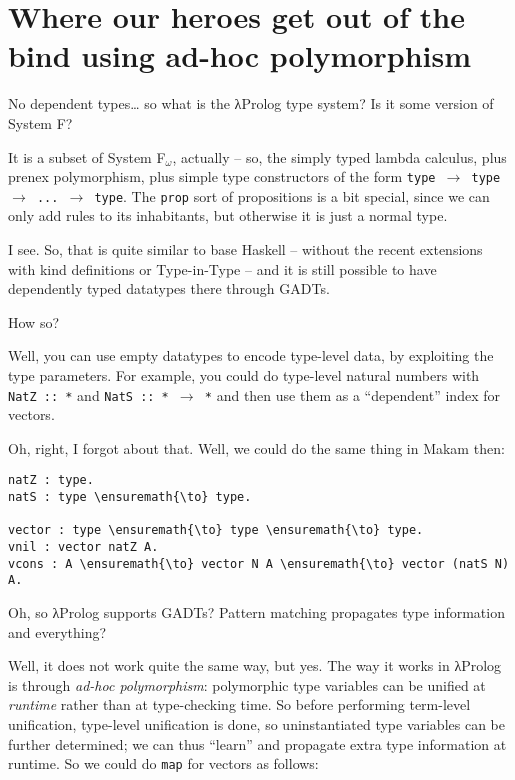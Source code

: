 \section{Where our heroes get out of the bind using ad-hoc
polymorphism}\label{where-our-heroes-get-out-of-the-bind-using-ad-hoc-polymorphism}

\heroSTUDENT{} No dependent types\ldots{} so what is the \foreignlanguage{greek}{λ}Prolog type system?
Is it some version of System F?

\heroADVISOR{} It is a subset of System F\(_\omega\), actually -- so, the
simply typed lambda calculus, plus prenex polymorphism, plus simple type
constructors of the form
\texttt{type\ \ensuremath{\to}\ type\ \ensuremath{\to}\ ...\ \ensuremath{\to}\ type}.
The \texttt{prop} sort of propositions is a bit special, since we can
only add rules to its inhabitants, but otherwise it is just a normal
type.

\heroSTUDENT{} I see. So, that is quite similar to base Haskell -- without the
recent extensions with kind definitions \citep{yorgey2012giving} or
Type-in-Type \citep{weirich2013system} -- and it is still possible to
have dependently typed datatypes there through GADTs.

\heroADVISOR{} How so?

\heroSTUDENT{} Well, you can use empty datatypes to encode type-level data, by
exploiting the type parameters. For example, you could do type-level
natural numbers with \texttt{NatZ\ ::\ *} and
\texttt{NatS\ ::\ *\ \ensuremath{\to}\ *} and then use them as a
``dependent'' index for vectors.

\heroADVISOR{} Oh, right, I forgot about that. Well, we could do the same
thing in Makam then:

\begin{verbatim}
natZ : type.
natS : type \ensuremath{\to} type.

vector : type \ensuremath{\to} type \ensuremath{\to} type.
vnil : vector natZ A.
vcons : A \ensuremath{\to} vector N A \ensuremath{\to} vector (natS N) A.
\end{verbatim}

\heroSTUDENT{} Oh, so \foreignlanguage{greek}{λ}Prolog supports GADTs? Pattern matching propagates type
information and everything?

\heroADVISOR{} Well, it does not work quite the same way, but yes. The way it
works in \foreignlanguage{greek}{λ}Prolog is through \emph{ad-hoc polymorphism}: polymorphic type
variables can be unified at \emph{runtime} rather than at type-checking
time. So before performing term-level unification, type-level
unification is done, so uninstantiated type variables can be further
determined; we can thus ``learn'' and propagate extra type information
at runtime. So we could do \texttt{map} for vectors as follows:

